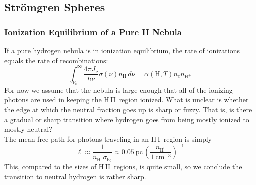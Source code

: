 \documentclass[10pt]{article}
\numberwithin{equation}{section}
\newcommand{\n}{\noindent}
\newcommand{\HI}{H\,I\ }
\newcommand{\HII}{H\,II\ }
\begin{document}
\subsection{Str\"omgren Spheres} %
\label{sub:stromgren_spheres}
\subsubsection{Ionization Equilibrium of a Pure H Nebula} %
\label{ssub:ionization_equilibrium}
If a pure hydrogen nebula is in ionization equilibrium, the rate of ionizations
equals the rate of recombinations:
\begin{equation}
  \label{eq:strom:1} \int_{\nu_0}^\infty \frac{4\pi J_\nu}{h\nu}
  \sigma(\nu)n_{\mathrm{H}}\,d\nu = \alpha(\mathrm{H}, T)n_e n_{\mathrm{H^+}}
\end{equation}
For now we assume that the nebula is large enough that all of the ionizing
photons are used in keeping the \HII region ionized. What is unclear is whether
the edge at which the neutral fraction goes up is sharp or fuzzy. That is, is
there a gradual or sharp transition where hydrogen goes from being mostly
ionized to mostly neutral?\\

\n The mean free path for photons traveling in an \HI region is simply
\begin{equation}
  \label{eq:strom:2} \ell \approx
  \frac{1}{n_{\mathrm{H^0}}\sigma_{\mathrm{\nu_0}}} \approx 0.05\
  \mathrm{\mathrm{pc}}\,\left(\frac{n_{\mathrm{H^0}}}{1\
  \mathrm{cm^{-3}}}\right)^{-1}
\end{equation}
This, compared to the sizes of \HII regions, is quite small, so we conclude the
transition to neutral hydrogen is rather sharp.\\
\end{document}
